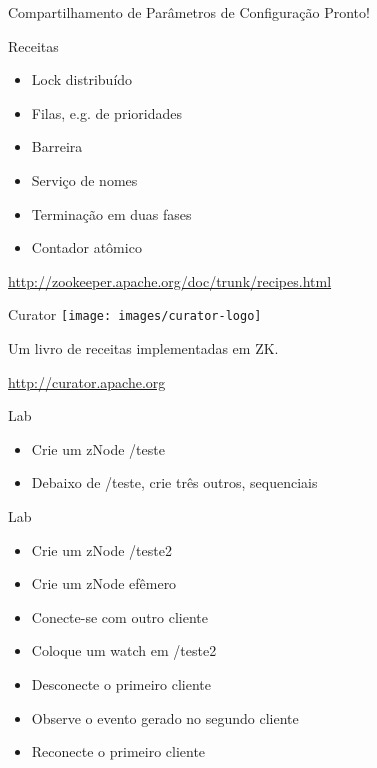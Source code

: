 \begin{frame}{Compartilhamento de Parâmetros de Configuração}
Pronto!
\end{frame}

\begin{frame}{Receitas}
\begin{itemize}
	\item Lock distribuído
	\item Filas, e.g. de prioridades
	\item Barreira
	\item Serviço de nomes
	\item Terminação em duas fases
	\item Contador atômico
\end{itemize}

\url{http://zookeeper.apache.org/doc/trunk/recipes.html}
\end{frame}

\begin{frame}{Curator}
\texttt{[image: images/curator-logo]}

Um livro de receitas implementadas em ZK.

\url{http://curator.apache.org}
\end{frame}

\begin{frame}{Lab}
	\begin{itemize}
		\item Crie um zNode /teste
		\item Debaixo de /teste, crie três outros, sequenciais
	\end{itemize}
\end{frame}

\begin{frame}{Lab}
\begin{itemize}
	\item Crie um zNode /teste2
	\item Crie um zNode efêmero
	\item Conecte-se com outro cliente
	\item Coloque um watch em /teste2
	\item Desconecte o primeiro cliente
	\item Observe o evento gerado no segundo cliente
	\item Reconecte o primeiro cliente
\end{itemize}
\end{frame}

